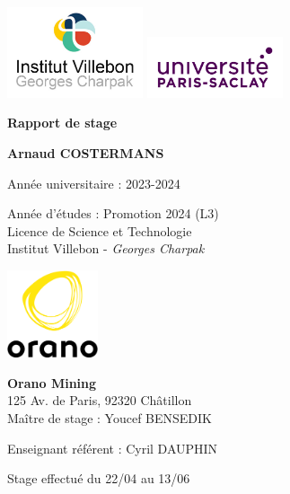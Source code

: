 \begin{titlepage}
    \centering
    
    \includegraphics[width=0.3\textwidth]{img/logo/logo_institut.jpeg} \includegraphics[width=0.3\textwidth]{img/logo/UPSaclay.jpg}

    \vspace{1.5cm}
    {\LARGE\textbf{Rapport de stage}\par}
    
    \vspace{1.5cm}
    {\large\textbf{Arnaud COSTERMANS}\par}
    
    \vspace{0.5cm}
    Année universitaire : 2023-2024
    
    \vspace{0.5cm}
    Année d'études : Promotion 2024 (L3) \\
    Licence de Science et Technologie \\
    Institut Villebon - \textit{Georges Charpak}
    
    \vspace{2cm}
    \includegraphics[width=0.2\textwidth]{img/logo/logo-orano.png}
    
    \vspace{0.5cm}
    \textbf{Orano Mining}\\
    125 Av. de Paris, 92320 Châtillon\\
    \vspace{0.5cm}
    Maître de stage : Youcef BENSEDIK
    
    \vspace{0.5cm}
    Enseignant référent : Cyril DAUPHIN
    
    \vspace{0.5cm}
    Stage effectué du 22/04 au 13/06 
\end{titlepage}
\clearpage